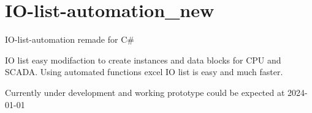 \chapter{IO-\/list-\/automation\+\_\+new}
\hypertarget{md__r_e_a_d_m_e}{}\label{md__r_e_a_d_m_e}
\label{md__r_e_a_d_m_e_autotoc_md0}%
%
IO-\/list-\/automation remade for C\#

IO list easy modifaction to create instances and data blocks for CPU and SCADA. Using automated functions excel IO list is easy and much faster.

Currently under development and working prototype could be expected at 2024-\/01-\/01 